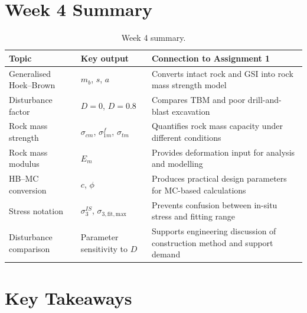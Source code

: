 \documentclass[a4paper,12pt]{article}
\begin{document}
\section{Week 4 Summary}

\begin{table}[H]
\centering
\small
\begin{tabularx}{\textwidth}{l Y Y}
\toprule
\textbf{Topic} & \textbf{Key output} & \textbf{Connection to Assignment 1} \\
\midrule
Generalised Hoek--Brown & \(m_b\), \(s\), \(a\) & Converts intact rock and GSI into rock mass strength model \\
Disturbance factor & \(D=0\), \(D=0.8\) & Compares TBM and poor drill-and-blast excavation \\
Rock mass strength & \(\sigma_{cm}\), \(\sigma_{1m}^f\), \(\sigma_{tm}\) & Quantifies rock mass capacity under different conditions \\
Rock mass modulus & \(E_m\) & Provides deformation input for analysis and modelling \\
HB--MC conversion & \(c\), \(\phi\) & Produces practical design parameters for MC-based calculations \\
Stress notation & \(\sigma_3^{IS}\), \(\sigma_{3,\mathrm{fit,max}}\) & Prevents confusion between in-situ stress and fitting range \\
Disturbance comparison & Parameter sensitivity to \(D\) & Supports engineering discussion of construction method and support demand \\
\bottomrule
\end{tabularx}
\caption{Week 4 summary.}
\label{tab:week4_summary}
\end{table}

\section{Key Takeaways}
\end{document}
